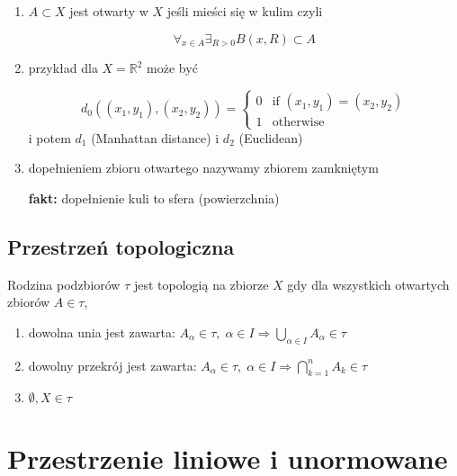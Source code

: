 \documentclass{article}
\begin{document}
\begin{enumerate}

\item $A \subset X$ jest otwarty w $X$ jeśli mieści się w kulim czyli

$$\forall_{x \in A} \exists_{R > 0} B(x, R) \subset A$$

\item przykład dla $X = \mathbb{R}^2$ może być

$$d_0\left((x_1,y_1), (x_2,y_2)\right) = \begin{cases} 
0 & \text{if } (x_1,y_1) = (x_2,y_2) \\
1 & \text{otherwise}
\end{cases}$$
i potem $d_1$ (Manhattan distance) i $d_2$ (Euclidean)

\item dopełnieniem zbioru otwartego nazywamy zbiorem zamkniętym

\textbf{fakt:} dopełnienie kuli to sfera (powierzchnia)

\end{enumerate}

\subsection{Przestrzeń topologiczna}

Rodzina podzbiorów $\tau$ jest topologią na zbiorze $X$ gdy dla wszystkich otwartych zbiorów $A \in \tau$,

\begin{enumerate}
\item dowolna unia jest zawarta: $A_\alpha \in \tau, \; \alpha \in I \Rightarrow \bigcup_{\alpha \in I} A_\alpha \in \tau$
\item dowolny przekrój jest zawarta: $A_\alpha \in \tau, \; \alpha \in I \Rightarrow \bigcap_{k=1}^n A_k \in \tau$
\item $\emptyset, X \in \tau$
\end{enumerate}

\section{Przestrzenie liniowe i unormowane}
\end{document}
